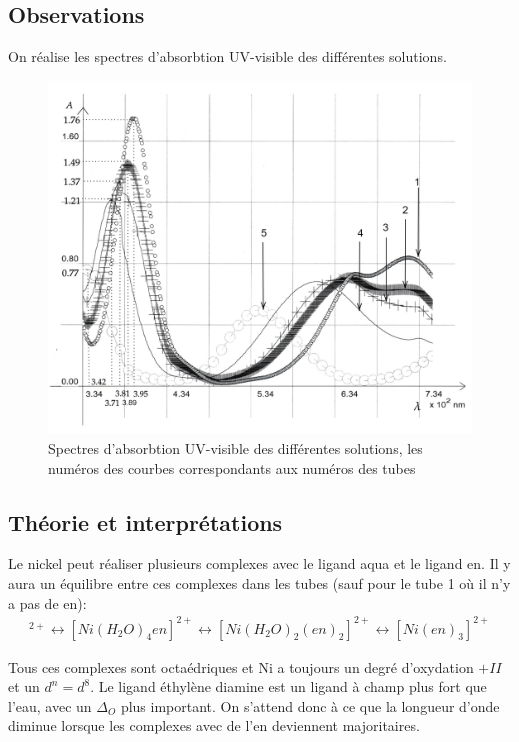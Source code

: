 \documentclass[12pt]{article}
\begin{document}
\newpage
\subsection{Observations}
On réalise les spectres d'absorbtion UV-visible des différentes solutions.

\begin{figure}[h!]
    \begin{center}
        \includegraphics[scale=0.5]{Spectre2_Inorga_bis.jpeg}
        \caption{Spectres d'absorbtion UV-visible des différentes solutions, les numéros des courbes correspondants aux numéros des tubes}
        \label{img2:Spectre_Exp3}
    \end{center}
\end{figure}

\subsection{Théorie et interprétations}

Le nickel peut réaliser plusieurs complexes avec le ligand aqua et le ligand en. 
Il y aura un équilibre entre ces complexes dans les tubes (sauf pour le tube 1 où il n'y a pas de en):
\begin{align*}
    [Ni(H_2O)_6]^{2+} \longleftrightarrow [Ni(H_2O)_4en]^{2+} \longleftrightarrow [Ni(H_2O)_2 (en)_2]^{2+} \longleftrightarrow [Ni(en)_3]^{2+}
\end{align*}

Tous ces complexes sont octaédriques et Ni a toujours un degré d'oxydation $+II$ et un $d^n=d^8$.
Le ligand éthylène diamine est un ligand à champ plus fort que l'eau, avec un $\Delta_O$ plus important.
On s'attend donc à ce que la longueur d'onde diminue lorsque les complexes avec de l'en deviennent majoritaires.
\end{document}
